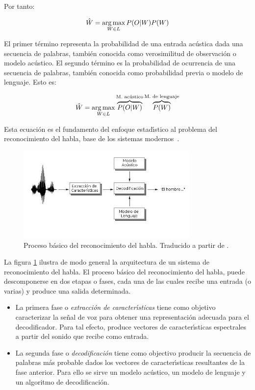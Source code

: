 Por tanto:

\begin{align}
\hat{W} = \operatorname*{arg\,max}_{W \in L} P(O|W)P(W)
\end{align}

El primer t\'ermino representa la probabilidad de una entrada ac\'ustica dada una secuencia de palabras, tambi\'en
conocida como verosimilitud de observaci\'on o modelo ac\'ustico. El segundo t\'ermino es la probabilidad 
 de ocurrencia de una secuencia de palabras, tambi\'en conocida como probabilidad previa o 
modelo de lenguaje. Esto es:

\begin{align}
\hat{W} = \operatorname*{arg\,max}_{W \in L} \overbrace{P(O|W)}^\text{M. ac\'ustico}\overbrace{P(W)}^\text{M. de lenguaje}
\label{eq:asrFundamental}
\end{align}

Esta ecuaci\'on es el fundamento del enfoque estad{\'\i}stico al problema del reconocimiento del habla, base de los
sistemas \mbox{modernos \cite{RabinerStatistical2006}}.

\begin{figure}[H] 
\centering
\includegraphics[width=0.8\textwidth]{./graphics/proceso.png}
\caption{Proceso b\'asico del reconocimiento del habla. Traducido a partir de \cite{VerenichASR}.}
\label{figure:proceso}
\end{figure}

La figura \ref{figure:proceso} ilustra de modo general la arquitectura de un sistema de reconocimiento del habla.
El proceso b\'asico del reconocimiento del habla, puede descomponerse en dos etapas o fases, cada una de las cuales
recibe una entrada (o varias) y produce una salida determinada.

\begin{itemize}
\item La primera fase o \emph{extracci\'on de caracter{\'\i}sticas} tiene como objetivo caracterizar la se\~nal
de voz para obtener una representaci\'on adecuada para el decodificador. Para tal efecto, produce vectores de
caracter{\'\i}sticas espectrales a partir del sonido que recibe como entrada.
\item La segunda fase o \emph{decodificaci\'on} tiene como objectivo producir la secuencia de palabras m\'as probable
dados los vectores de caracter{\'\i}sticas resultantes de la fase anterior. Para ello se sirve un modelo ac\'ustico, un
modelo de lenguaje y un algoritmo de decodificaci\'on.
\end{itemize}

